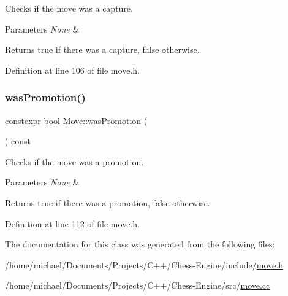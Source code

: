 Checks if the move was a capture. 


\begin{DoxyParams}{Parameters}
{\em None} & \\
\hline
\end{DoxyParams}
\begin{DoxyReturn}{Returns}
true if there was a capture, false otherwise. 
\end{DoxyReturn}


Definition at line 106 of file move.\+h.

\mbox{\label{classMove_a06483745a13016873fc99db2ea74e042}} 
\subsubsection{\texorpdfstring{was\+Promotion()}{wasPromotion()}}
{\footnotesize\ttfamily constexpr bool Move\+::was\+Promotion (\begin{DoxyParamCaption}{ }\end{DoxyParamCaption}) const\hspace{0.3cm}{\ttfamily [inline]}}



Checks if the move was a promotion. 


\begin{DoxyParams}{Parameters}
{\em None} & \\
\hline
\end{DoxyParams}
\begin{DoxyReturn}{Returns}
true if there was a promotion, false otherwise. 
\end{DoxyReturn}


Definition at line 112 of file move.\+h.



The documentation for this class was generated from the following files\+:\begin{DoxyCompactItemize}
\item 
/home/michael/\+Documents/\+Projects/\+C++/\+Chess-\/\+Engine/include/\mbox{\hyperlink{move_8h}{move.\+h}}\item 
/home/michael/\+Documents/\+Projects/\+C++/\+Chess-\/\+Engine/src/\mbox{\hyperlink{move_8cc}{move.\+cc}}\end{DoxyCompactItemize}
